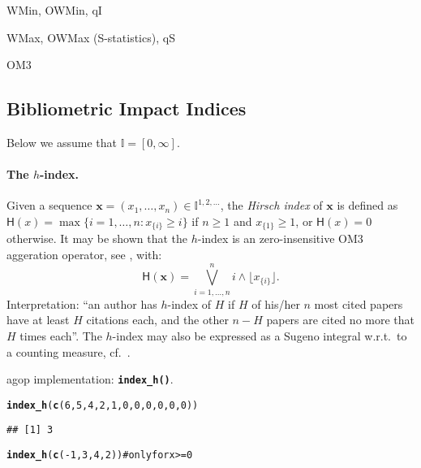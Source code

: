 \documentclass[11pt]{article}\usepackage{graphicx, color}
\makeatletter
\newcommand{\hlfunctioncall}[1]{\textcolor[rgb]{0.501960784313725,0,0.329411764705882}{\textbf{#1}}}%
\newcommand{\hlcomment}[1]{\textcolor[rgb]{0.180392156862745,0.6,0.341176470588235}{#1}}%
\newenvironment{kframe}{%
 \def\at@end@of@kframe{}%
 \ifinner\ifhmode%
  \def\at@end@of@kframe{\end{minipage}}%
  \begin{minipage}{\columnwidth}%
 \fi\fi%
 \def\FrameCommand##1{\hskip\@totalleftmargin \hskip-\fboxsep
 \colorbox{shadecolor}{##1}\hskip-\fboxsep
     \hskip-\linewidth \hskip-\@totalleftmargin \hskip\columnwidth}%
 \MakeFramed {\advance\hsize-\width
   \@totalleftmargin\z@ \linewidth\hsize
   \@setminipage}}%
 {\par\unskip\endMakeFramed%
 \at@end@of@kframe}
\newenvironment{knitrout}{}{} %
\renewcommand{\emph}[1]{\textsl{#1}}
\newcommand{\package}[1]{\textsf{#1}\xspace}
\newcommand{\Rfunc}[1]{\texttt{\hlfunctioncall{#1}}}
\newcommand{\vect}[1]{{\mathbf{#1}}}
\newcommand{\func}[1]{{\mathsf{#1}}}
\newcommand{\Ival}{\mathbb{I}}
\newcommand{\AnyPow}{^{1,2,\dots}}
\newcommand{\IvalAnyPow}{\mathbb{I}\AnyPow}
\theoremstyle{remark}
\theoremstyle{definition}
\makeatother
\begin{document}
WMin, OWMin, qI

WMax, OWMax (S-statistics), qS 

OM3


\subsection{Bibliometric Impact Indices}

Below we assume that $\Ival=[0,\infty]$.


\paragraph{The $h$-index.}
Given a sequence $\vect{x}=(x_1,\dots,x_n)\in\IvalAnyPow$,
the \emph{Hirsch index} \cite{Hirsch2005:hindex} of $\vect{x}$ is defined as
$\func{H}(x)=\max\{i=1,\dots,n: x_{\{i\}} \ge i\}$
if $n \ge 1$ and $x_{\{1\}} \ge 1$, or $\func{H}(x)=0$ otherwise.
It may be shown that the $h$-index is an zero-insensitive
OM3 aggeration operator,
see \cite{Gagolewski2013:om3}, with:
\[
   \func{H}(\vect{x}) = \bigvee_{i=1,\dots,n}^n i\wedge \lfloor x_{\{i\}}\rfloor.
\]
Interpretation: ``an author has $h$-index of $H$ if $H$ of his/her
$n$ most cited papers have at least $H$ citations each, and the other $n-H$
papers are cited no more that $H$ times each''.
The $h$-index may also be expressed as a Sugeno 
integral \cite{Sugeno1974:PhD}
w.r.t.~to a counting measure, cf.~\cite{TorraNarukawa2008:h2fuzzyintegrals}.

\package{agop} implementation: \Rfunc{index\_h()}.

\begin{knitrout}\small
{}\color{fgcolor}\begin{kframe}
\begin{alltt}
\hlfunctioncall{index_h}(\hlfunctioncall{c}(6,5,4,2,1,0,0,0,0,0,0))
\end{alltt}
\begin{verbatim}
## [1] 3
\end{verbatim}
\begin{alltt}
\hlfunctioncall{index_h}(\hlfunctioncall{c}(-1,3,4,2)) \hlcomment{# only for x>=0}
\end{alltt}


{\ttfamily\noindent\bfseries\color{errorcolor}{\#\# Error: all elements in `x` should be in [0,Inf]}}\end{kframe}
\end{knitrout}
\end{document}
